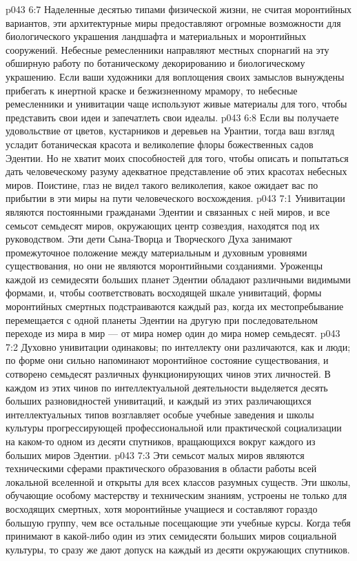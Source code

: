 \vs p043 6:7 Наделенные десятью типами физической жизни, не считая моронтийных вариантов, эти архитектурные миры предоставляют огромные возможности для биологического украшения ландшафта и материальных и моронтийных сооружений. Небесные ремесленники направляют местных спорнагий на эту обширную работу по ботаническому декорированию и биологическому украшению. Если ваши художники для воплощения своих замыслов вынуждены прибегать к инертной краске и безжизненному мрамору, то небесные ремесленники и унивитации чаще используют живые материалы для того, чтобы представить свои идеи и запечатлеть свои идеалы.
\vs p043 6:8 Если вы получаете удовольствие от цветов, кустарников и деревьев на Урантии, тогда ваш взгляд усладит ботаническая красота и великолепие флоры божественных садов Эдентии. Но не хватит моих способностей для того, чтобы описать и попытаться дать человеческому разуму адекватное представление об этих красотах небесных миров. Поистине, глаз не видел такого великолепия, какое ожидает вас по прибытии в эти миры на пути человеческого восхождения.
\vs p043 7:1 Унивитации являются постоянными гражданами Эдентии и связанных с ней миров, и все семьсот семьдесят миров, окружающих центр созвездия, находятся под их руководством. Эти дети Сына\hyp{}Творца и Творческого Духа занимают промежуточное положение между материальным и духовным уровнями существования, но они не являются моронтийными созданиями. Уроженцы каждой из семидесяти больших планет Эдентии обладают различными видимыми формами, и, чтобы соответствовать восходящей шкале унивитаций, формы моронтийных смертных подстраиваются каждый раз, когда их местопребывание перемещается с одной планеты Эдентии на другую при последовательном переходе из мира в мир --- от мира номер один до мира номер семьдесят.
\vs p043 7:2 Духовно унивитации одинаковы; по интеллекту они различаются, как и люди; по форме они сильно напоминают моронтийное состояние существования, и сотворено семьдесят различных функционирующих чинов этих личностей. В каждом из этих чинов по интеллектуальной деятельности выделяется десять больших разновидностей унивитаций, и каждый из этих различающихся интеллектуальных типов возглавляет особые учебные заведения и школы культуры прогрессирующей профессиональной или практической социализации на каком\hyp{}то одном из десяти спутников, вращающихся вокруг каждого из больших миров Эдентии.
\vs p043 7:3 Эти семьсот малых миров являются техническими сферами практического образования в области работы всей локальной вселенной и открыты для всех классов разумных существ. Эти школы, обучающие особому мастерству и техническим знаниям, устроены не только для восходящих смертных, хотя моронтийные учащиеся и составляют гораздо большую группу, чем все остальные посещающие эти учебные курсы. Когда тебя принимают в какой\hyp{}либо один из этих семидесяти больших миров социальной культуры, то сразу же дают допуск на каждый из десяти окружающих спутников.
